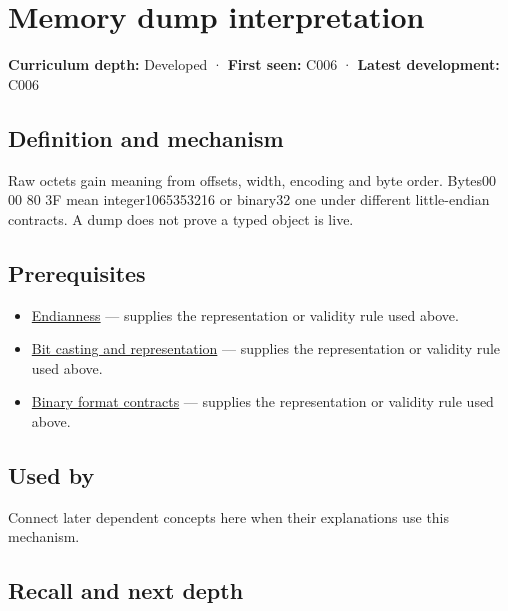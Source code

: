 \hypertarget{appendix-230b59c0676b}{}\label{referencestart:appendix-230b59c0676b}
\section{Memory dump interpretation}\label{appendix-230b59c0676b-memory-dump-interpretation}

\textbf{Curriculum depth:} Developed · \textbf{First seen:} C006 · \textbf{Latest development:} C006

\begin{allmightroledefinition}

\subsection{Definition and mechanism}\label{appendix-230b59c0676b-definition-and-mechanism}

Raw octets gain meaning from offsets, width, encoding and byte order. Bytes00 00 80 3F mean integer1065353216 or binary32 one under different little-endian contracts. A dump does not prove a typed object is live.

\end{allmightroledefinition}

\subsection{Prerequisites}\label{appendix-230b59c0676b-prerequisites}

\begin{itemize}
\tightlist
\item
  \hyperref[appendix-bc07c3d25b18]{Endianness} --- supplies the representation or validity rule used above.
\item
  \hyperref[appendix-34ee45f161c1]{Bit casting and representation} --- supplies the representation or validity rule used above.
\item
  \hyperref[appendix-590bbb2424c1]{Binary format contracts} --- supplies the representation or validity rule used above.
\end{itemize}

\subsection{Used by}\label{appendix-230b59c0676b-used-by}

Connect later dependent concepts here when their explanations use this mechanism.

\subsection{Recall and next depth}\label{appendix-230b59c0676b-recall-and-next-depth}

